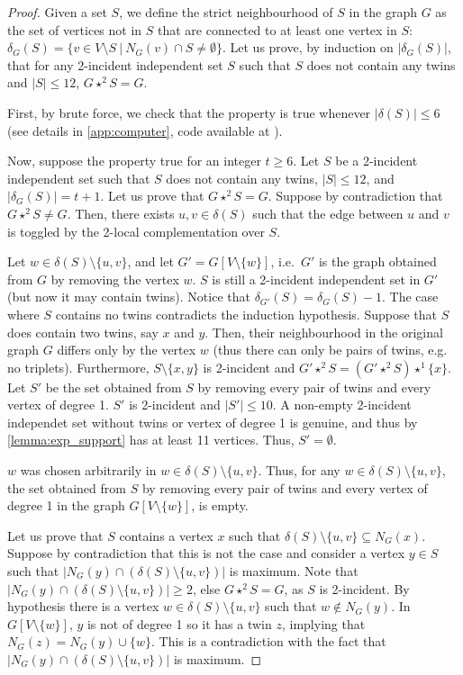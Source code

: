 \documentclass[a4paper,UKenglish,cleveref,autoref,thm-restate]{arxiv}
\newcommand{\se}{\subseteq}
\newcommand{\ls}{\leqslant}
\newcommand{\gs}{\geqslant}
\newcommand{\sm}{\setminus}
\begin{document}
\lessthantwelve*

\begin{proof}
    Given a set $S$, we define the strict neighbourhood of $S$ in the graph $G$ as the set of vertices not in $S$ that are connected to at least one vertex in $S$: $\delta_G(S) = \{v \in V \sm S ~|~ N_G(v) \cap S \neq \emptyset\}$. Let us prove, by induction on $|\delta_G(S)|$, that for any 2-incident independent set $S$ such that $S$ does not contain any twins and $|S| \ls 12$, $G \star^2 S = G$.

    First, by brute force, we check that the property is true whenever $|\delta(S)| \ls 6$ (see details in \cref{app:computer}, code available at \cite{codelulc19}). 

    Now, suppose the property true for an integer $t \gs 6$. Let $S$ be a 2-incident independent set such that $S$ does not contain any twins, $|S| \ls 12$, and $|\delta_G(S)| = t+1$. Let us prove that $G \star^{2} S = G$. Suppose by contradiction that $G \star^{2} S \neq G$. Then, there exists $u,v \in \delta(S)$ such that the edge between $u$ and $v$ is toggled by the 2-local complementation over $S$. 
    
    Let $w \in \delta(S) \sm \{u,v\}$, and let $G' = G[V \sm \{w\}]$, i.e.~$G'$ is the graph obtained from $G$ by removing the vertex $w$. $S$ is still a 2-incident independent set in $G'$ (but now it may contain twins). Notice that $\delta_{G'}(S) = \delta_{G}(S) -1$. The case where $S$ contains no twins contradicts the induction hypothesis. Suppose that $S$ does contain two twins, say $x$ and $y$. Then, their neighbourhood in the original graph $G$ differs only by the vertex $w$ (thus there can only be pairs of twins, e.g. no triplets). Furthermore, $S \sm \{x,y\}$ is 2-incident and $G' \star^2 S = (G' \star^2 S) \star^1 \{x\}$. Let $S'$ be the set obtained from $S$ by removing every pair of twins and every vertex of degree 1. $S'$ is 2-incident and $|S'|\ls 10$. A non-empty 2-incident independet set without twins or vertex of degree 1 is genuine, and thus by \cref{lemma:exp_support} has at least 11 vertices. Thus, $S' = \emptyset$.

    $w$ was chosen arbitrarily in $w \in \delta(S) \sm \{u,v\}$. Thus, for any $w\in \delta(S) \sm \{u,v\}$, the set obtained from $S$ by removing every pair of twins and every vertex of degree 1 in the graph $G[V \sm \{w\}]$, is empty. 

    Let us prove that $S$ contains a vertex $x$ such that $\delta(S) \sm \{u,v\} \se N_G(x)$. Suppose by contradiction that this is not the case and consider a vertex $y \in S$ such that $|N_G(y) \cap (\delta(S) \sm \{u,v\})|$ is maximum. Note that $|N_G(y) \cap (\delta(S) \sm \{u,v\})| \gs 2$, else  $G \star^2 S = G$, as $S$ is 2-incident. By hypothesis there is a vertex $w \in \delta(S) \sm \{u,v\}$ such that $w \notin N_G(y)$. In $G[V \sm \{w\}]$, $y$ is not of degree 1 so it has a twin $z$, implying that $N_G(z) = N_G(y) \cup \{w\}$. This is a contradiction with the fact that $|N_G(y) \cap (\delta(S) \sm \{u,v\})|$ is maximum.


\end{proof}
\end{document}
